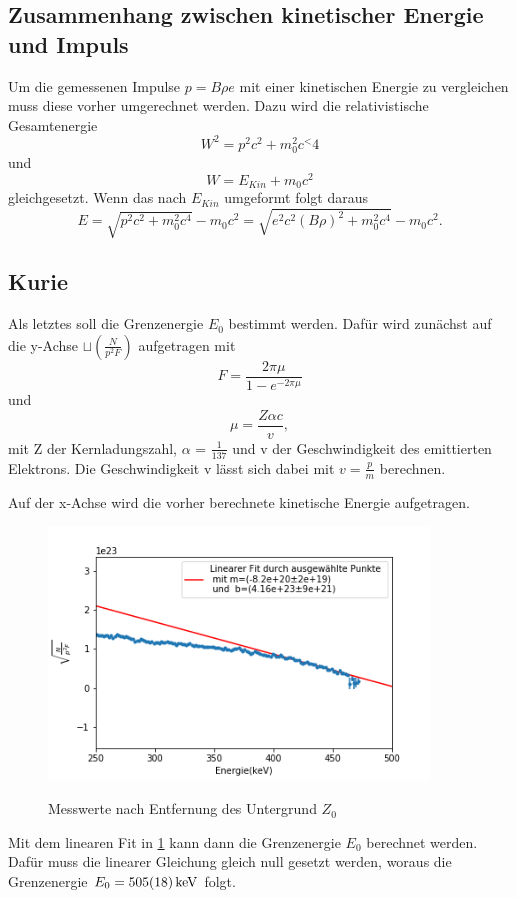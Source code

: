 \subsection{Zusammenhang zwischen kinetischer Energie und Impuls}
Um die gemessenen Impulse $p = B \rho e$ mit einer kinetischen Energie zu vergleichen muss diese vorher umgerechnet werden. Dazu wird die relativistische Gesamtenergie
\begin{equation}
	W^{2} = p^{2}c^{2} + m_{0}^{2} c^<{4}
\end{equation} 
und 
\begin{equation}
	W = E_{Kin} + m_{0}c^{2}
\end{equation}	
gleichgesetzt. Wenn das nach $E_{Kin}$ umgeformt folgt daraus
\begin{equation}
	E = \sqrt{p^{2}c^{2}+m_{0}^{2}c^{4}}-m_{0}c^{2} = \sqrt{e^{2}c^{2}(B \rho)^{2}+m_{0}^{2}c^{4}}-m_{0}c^{2}.
	\label{Ekin}
\end{equation}

	
	
\subsection{Kurie}
Als letztes soll die Grenzenergie $E_{0}$ bestimmt werden. Dafür wird zunächst auf die y-Achse $\sqcup(\frac{N}{p^{2}F})$ aufgetragen mit
\begin{equation}
	F = \frac{2 \pi \mu}{1-e^{-2 \pi \mu}}
\end{equation}
und 
\begin{equation}
	\mu = \frac{Z \alpha c}{v},
\end{equation} 
mit Z der Kernladungszahl, $\alpha$ = $\frac{1}{137}$ und v der Geschwindigkeit des emittierten Elektrons. Die Geschwindigkeit v lässt sich dabei mit $v = \frac{p}{m}$ berechnen.

Auf der x-Achse wird die vorher berechnete kinetische Energie aufgetragen.

\begin{figure}[h]
	\centering
	\includegraphics[width=0.9\textwidth]{../Messdaten/Kurie.png}
	\label{Kurie}
	\caption{Messwerte nach Entfernung des Untergrund $Z_{0}$}
\end{figure}

Mit dem linearen Fit in \cref{Kurie} kann dann die Grenzenergie $E_{0}$ berechnet werden. Dafür muss die linearer Gleichung gleich null gesetzt werden, woraus die Grenzenergie $E_{0} = \SI{505 \pm 18}{keV}$ folgt. 